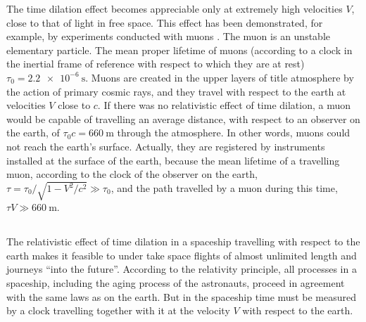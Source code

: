 The time dilation effect becomes appreciable only at extremely high velocities $V$, close to that of light in free space. This effect has been demonstrated, for example, by experiments conducted with muons . The muon is an unstable elementary particle. The mean proper lifetime of muons (according to a clock in the inertial frame of reference with respect to which they are at rest) $\tau_{0}= \SI{2.2e-6}{\second}$. Muons are created in the upper layers of title atmosphere by the action of primary cosmic rays, and they travel with respect to the earth at velocities $V$ close to $c$. If there was no relativistic effect of time dilation, a muon would be capable of travelling an average distance, with respect to an observer on the earth, of $\tau_{0}c = \SI{660}{\meter}$ through the at­mosphere. In other words, muons could not reach the earth's surface. Actually, they are registered by instruments installed at the surface of the earth, because the mean lifetime of a trav­elling muon, according to the clock of the observer on the earth, $\tau = \tau_{0}/\sqrt{1 - V^{2}/c^{2}} \gg \tau_{0}$, and the path travelled by a muon during this time, $\tau V \gg \SI{660}{\meter}$.

\clearpage

\subsection{}\label{5.4.6} The relativistic effect of time dilation in a spaceship travelling with respect to the earth makes it feasible to under­ take space flights of almost unlimited length and journeys ``into the future''. According to the relativity principle, all processes in a spaceship, including the aging process of the astronauts, proceed in agreement with the same laws as on the earth. But in the spaceship time must be measured by a clock travelling together with it at the velocity $V$ with respect to the earth. 

